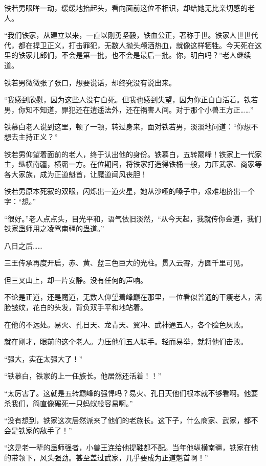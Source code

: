 
\begin{this_body}

铁若男眼眸一动，缓缓地抬起头，看向面前这位不相识，却给她无比亲切感的老人。

“我们铁家，从建立以来，一直以刚勇坚毅，铁血公正，著称于世。铁家人世世代代，都在捍卫正义，打击罪犯，无数人抛头颅洒热血，就像这样牺牲。今天死在这里的铁家儿郎们，不会是第一批，也不会是最后一批。你，明白吗？”老人继续道。

铁若男微微张了张口，想要说话，却终究没有说出来。

“我感到欣慰，因为这些人没有白死。但我也感到失望，因为你正白白活着。铁若男，你知不知道，罪犯还在逍遥法外，还在祸害人间。对于那个小兽王方正……”

铁慕白老人说到这里，顿了一顿，转过身来，面对铁若男，淡淡地问道：“你想不想去主持正义？”

铁若男仰望着面前的老人，终于认出他的身份。铁慕白，五转巅峰！铁家上一代家主，纵横南疆，横霸一方。在位期间，将铁家打造得铁桶一般，力压武家、商家等各大家族，成为正道魁首，让魔道闻风丧胆！

铁若男原本死寂的双眼，闪烁出一道火星，她从沙哑的嗓子中，艰难地挤出一个字：“想。”

“很好。”老人点点头，目光平和，语气依旧淡然，“从今天起，我就传你金道，我们铁家蛊师用之凌驾南疆的蛊道。”

八日之后……

三王传承再度开启，赤、黄、蓝三色巨大的光柱。贯入云霄，方圆千里可见。

但三叉山上，却一片安静。没有任何的声响。

不论是正道，还是魔道，无数人仰望着峰巅在那里，一位看似普通的干瘦老人，满脸皱纹，花白的头发，背负双手平和地站着。

在他的不远处。易火、孔日天、龙青天、翼冲、武神通五人，各个脸色灰败。

就在刚才，眼前的这个老人。力压他们五人联手。轻而易举，就将他们击败。

“强大，实在太强大了！”

“铁慕白，铁家的上一任族长。他居然还活着！！”

“太厉害了。这就是五转巅峰的强悍吗？易火、孔日天他们根本就不够看啊。他要杀我们，简直像碾死一只蚂蚁般容易啊。”

“没有想到，铁家这次居然派来了他们的老族长。这下子，什么商家、武家，都不会是铁家的敌手了！”

“这是老一辈的蛊师强者，小兽王连给他提鞋都不配。当年他纵横南疆，铁家在他的带领下，风头强劲。甚至盖过武家，几乎要成为正道魁首啊！”


\end{this_body}

